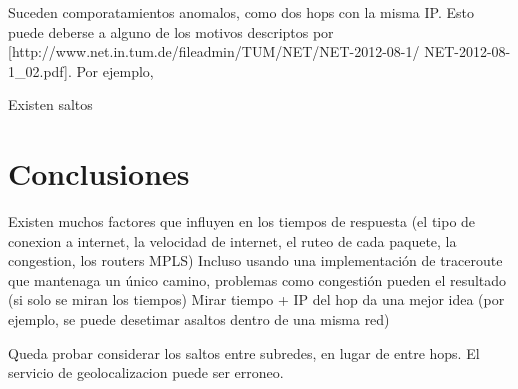 Suceden comporatamientos anomalos, como dos hops con la misma IP. Esto puede deberse a alguno de los motivos descriptos por [http://www.net.in.tum.de/fileadmin/TUM/NET/NET-2012-08-1/
NET-2012-08-1_02.pdf]. Por ejemplo, 

Existen saltos 


\section{Conclusiones}

	Existen muchos factores que influyen en los tiempos de respuesta (el tipo de conexion a internet, la velocidad de internet, el ruteo de cada paquete, la congestion, los routers MPLS)
	Incluso usando una implementación de traceroute que mantenaga un único camino, problemas como congestión pueden el resultado (si solo se miran los tiempos)
	Mirar tiempo + IP del hop da una mejor idea (por ejemplo, se puede desetimar asaltos dentro de una misma red)

	Queda probar considerar los saltos entre subredes, en lugar de entre hops.
	El servicio de geolocalizacion puede ser erroneo.
	